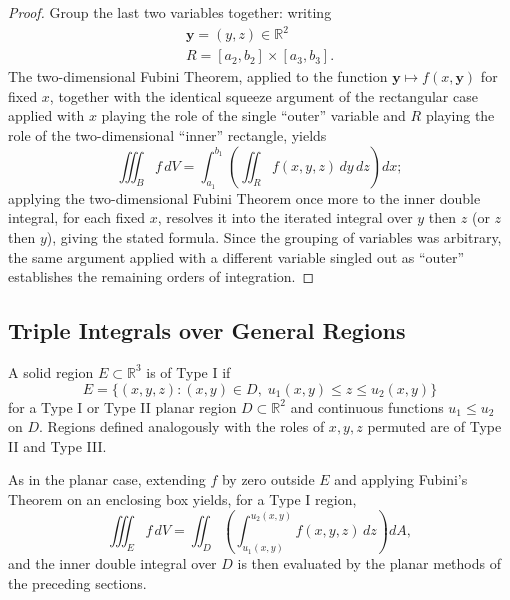 \begin{proof}
Group the last two variables together: writing
\[
\begin{gathered}
\mathbf{y} = (y,z) \in \mathbb{R}^2 \\
R = [a_2,b_2]\times[a_3,b_3].
\end{gathered}
\]
The two-dimensional Fubini Theorem, applied to the function $\mathbf{y} \mapsto f(x,\mathbf{y})$ for fixed $x$, together with the identical squeeze argument of the rectangular case applied with $x$ playing the role of the single ``outer'' variable and $R$ playing the role of the two-dimensional ``inner'' rectangle, yields \[
\iiint_B f\, dV = \int_{a_1}^{b_1}\left(\iint_R f(x,y,z)\, dy\,dz\right) dx;
\] applying the two-dimensional Fubini Theorem once more to the inner double integral, for each fixed $x$, resolves it into the iterated integral over $y$ then $z$ (or $z$ then $y$), giving the stated formula. Since the grouping of variables was arbitrary, the same argument applied with a different variable singled out as ``outer'' establishes the remaining orders of integration.
\end{proof}

\subsection{Triple Integrals over General Regions}

\begin{definition}
A solid region $E \subset \mathbb{R}^3$ is of Type I if
\[
E = \big\{ (x,y,z) : (x,y) \in D, \; u_1(x,y) \leq z \leq u_2(x,y) \big\}
\]
 for a Type I or Type II planar region $D \subset \mathbb{R}^2$ and continuous functions $u_1 \leq u_2$ on $D$. Regions defined analogously with the roles of $x,y,z$ permuted are of Type II and Type III.
\end{definition}

As in the planar case, extending $f$ by zero outside $E$ and applying Fubini's Theorem on an enclosing box yields, for a Type I region, \[
\iiint_E f\, dV = \iint_D \left( \int_{u_1(x,y)}^{u_2(x,y)} f(x,y,z)\, dz \right) dA,
\] and the inner double integral over $D$ is then evaluated by the planar methods of the preceding sections.

